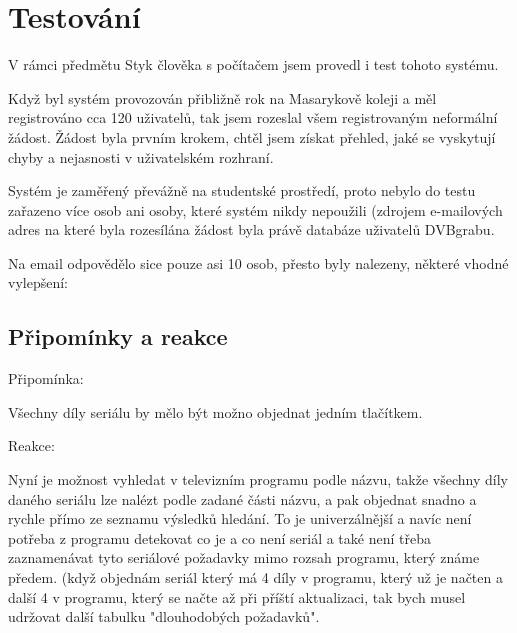 \chapter{Testování}

V rámci předmětu Styk člověka s počítačem jsem provedl i test tohoto systému.

\vspace{10pt}

Když byl systém provozován přibližně rok na Masarykově koleji a měl registrováno cca 120 uživatelů, tak jsem rozeslal všem registrovaným neformální žádost. Žádost byla prvním krokem, chtěl jsem získat přehled, jaké se vyskytují chyby a nejasnosti v uživatelském rozhraní. 

\vspace{10pt}

Systém je zaměřený převážně na studentské prostředí, proto nebylo do testu zařazeno více osob ani osoby, které systém nikdy nepoužili (zdrojem e-mailových adres na které byla rozesílána žádost byla právě databáze uživatelů DVBgrabu.

\vspace{10pt}

Na email odpovědělo sice pouze asi 10 osob, přesto byly nalezeny, některé vhodné vylepšení:

\vspace{10pt}

\section{Připomínky a reakce}

\begin{bf}Připomínka:\end{bf} Všechny díly seriálu by mělo být možno objednat jedním tlačítkem.

\begin{bf}Reakce:\end{bf} Nyní je možnost vyhledat v televizním programu podle názvu, takže všechny díly daného seriálu lze nalézt podle zadané části názvu, a pak objednat snadno a rychle přímo ze seznamu výsledků hledání. To je univerzálnější a navíc není potřeba z programu detekovat co je a co není seriál a také není třeba zaznamenávat tyto seriálové požadavky mimo rozsah programu, který známe předem. (když objednám seriál který má 4 díly v programu, který už je načten a další 4 v programu, který se načte až při příští aktualizaci, tak bych musel udržovat další tabulku "dlouhodobých požadavků".

